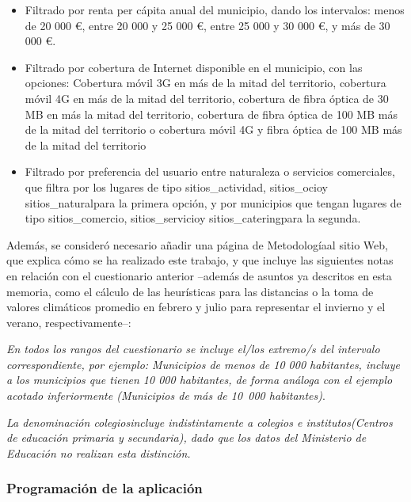 \begin{itemize}
    \item Filtrado por renta per cápita anual del municipio, dando los intervalos: menos de 20 000 €, entre 20 000 y 25 000 €, entre 25 000 y 30 000 €, y más de 30 000 €.
    \item Filtrado por cobertura de Internet disponible en el municipio, con las opciones: Cobertura móvil 3G en más de la mitad del territorio, cobertura móvil 4G en más de la mitad del territorio, cobertura de fibra óptica de 30 MB en más la mitad del territorio, cobertura de fibra óptica de 100 MB más de la mitad del territorio o cobertura móvil 4G y fibra óptica de 100 MB más de la mitad del territorio
    \item Filtrado por preferencia del usuario entre naturaleza o servicios comerciales, que filtra por los lugares de tipo \guillemotleft sitios\_actividad\guillemotright, \guillemotleft sitios\_ocio\guillemotright\space y \guillemotleft sitios\_natural\guillemotright\space para la primera opción, y por municipios que tengan lugares de tipo \guillemotleft sitios\_comercio\guillemotright, \guillemotleft sitios\_servicio\guillemotright\space y \guillemotleft sitios\_catering\guillemotright\space para la segunda.
\end{itemize}

Además, se consideró necesario añadir una página de \guillemotleft Metodología\guillemotright\space al sitio Web, que explica cómo se ha realizado este trabajo, y que incluye las siguientes notas en relación con el cuestionario anterior –además de asuntos ya descritos en esta memoria, como el cálculo de las heurísticas para las distancias o la toma de valores climáticos promedio en febrero y julio para representar el invierno y el verano, respectivamente–:

\textit{En todos los rangos del cuestionario se incluye el/los extremo/s del intervalo correspondiente, por ejemplo: \guillemotleft Municipios de menos de 10 000 habitantes\guillemotright, incluye a los municipios que tienen 10 000 habitantes, de forma análoga con el ejemplo acotado inferiormente (\guillemotleft Municipios de más de 10~000 habitantes\guillemotright)}.

\textit{La denominación \guillemotleft colegios\guillemotright\space incluye indistintamente a \guillemotleft colegios e institutos\guillemotright\space (Centros de educación primaria y secundaria), dado que los datos del Ministerio de Educación no realizan esta distinción.}

\subsubsection{Programación de la aplicación}

